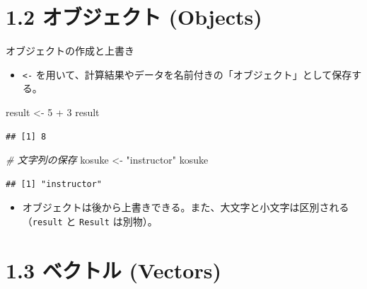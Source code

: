 \documentclass[
  ignorenonframetext,
]{beamer}
\newenvironment{Shaded}{\begin{snugshade}}{\end{snugshade}}
\newcommand{\CommentTok}[1]{\textcolor[rgb]{0.56,0.35,0.01}{\textit{#1}}}
\newcommand{\DecValTok}[1]{\textcolor[rgb]{0.00,0.00,0.81}{#1}}
\newcommand{\NormalTok}[1]{#1}
\newcommand{\OtherTok}[1]{\textcolor[rgb]{0.56,0.35,0.01}{#1}}
\newcommand{\SpecialCharTok}[1]{\textcolor[rgb]{0.00,0.00,0.00}{#1}}
\newcommand{\StringTok}[1]{\textcolor[rgb]{0.31,0.60,0.02}{#1}}
\providecommand{\tightlist}{%
  \setlength{\itemsep}{0pt}\setlength{\parskip}{0pt}}
\begin{document}
\hypertarget{ux30aaux30d6ux30b8ux30a7ux30afux30c8-objects}{%
\section{1.2 オブジェクト
(Objects)}\label{ux30aaux30d6ux30b8ux30a7ux30afux30c8-objects}}

\begin{frame}[fragile]{オブジェクトの作成と上書き}
\protect\hypertarget{ux30aaux30d6ux30b8ux30a7ux30afux30c8ux306eux4f5cux6210ux3068ux4e0aux66f8ux304d}{}
\begin{itemize}
\tightlist
\item
  \texttt{\textless{}-}
  を用いて、計算結果やデータを名前付きの「オブジェクト」として保存する。
\end{itemize}

\begin{Shaded}
\begin{Highlighting}[]
\NormalTok{result }\OtherTok{\textless{}{-}} \DecValTok{5} \SpecialCharTok{+} \DecValTok{3}
\NormalTok{result}
\end{Highlighting}
\end{Shaded}

\begin{verbatim}
## [1] 8
\end{verbatim}

\begin{Shaded}
\begin{Highlighting}[]
\CommentTok{\# 文字列の保存}
\NormalTok{kosuke }\OtherTok{\textless{}{-}} \StringTok{"instructor"}
\NormalTok{kosuke}
\end{Highlighting}
\end{Shaded}

\begin{verbatim}
## [1] "instructor"
\end{verbatim}

\begin{itemize}
\tightlist
\item
  オブジェクトは後から上書きできる。また、大文字と小文字は区別される（\texttt{result}
  と \texttt{Result} は別物）。
\end{itemize}
\end{frame}

\hypertarget{ux30d9ux30afux30c8ux30eb-vectors}{%
\section{1.3 ベクトル
(Vectors)}\label{ux30d9ux30afux30c8ux30eb-vectors}}
\end{document}
